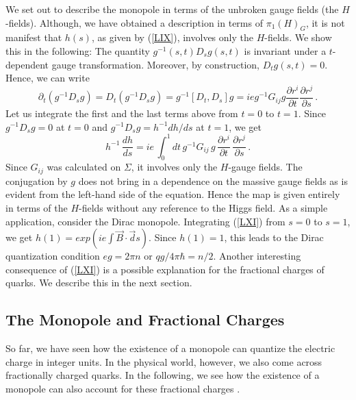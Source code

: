 We set out to describe the monopole in terms of the unbroken gauge
fields (the $H$-fields). Although, we have obtained a description in
terms of $\pi_1(H)_G$, it is not manifest that $h(s)$, as given by
(\ref{LIX}), involves only the $H$-fields. We show this in the
following: The quantity $g^{-1}(s,t)D_s g(s,t)$ is invariant under a
$t$-dependent gauge transformation. Moreover, by construction, $D_t
g(s,t)=0$. Hence, we can write
\begin{equation}
\partial_t(g^{-1}D_s g)= D_t(g^{-1}D_s g)=g^{-1}[D_t,D_s] g =
ie g^{-1} G_{ij} g \frac{\partial r^i}{\partial t} \frac{\partial r^j}
{\partial s}\,.
\label{LX}
\end{equation}
Let us integrate the first and the last terms above from $t=0$ to
$t=1$. Since $g^{-1}D_s g=0$ at $t=0$ and $g^{-1}D_s g=h^{-1}dh/ds$ at
$t=1$, we get
\begin{equation}
h^{-1} \, \frac{dh}{ds} = ie \, \int^{1}_{0} dt \,
g^{-1} G_{ij}\,g \,\frac{\partial r^i}{\partial t} \,
\frac{\partial r^j}{\partial s}\,.
\label{LXI}
\end{equation}
Since $G_{ij}$ was calculated on $\Sigma$, it involves only the
$H$-gauge fields. The conjugation by $g$ does not bring in a
dependence on the massive gauge fields as is evident from the
left-hand side of the equation. Hence the map is given entirely in
terms of the $H$-fields without any reference to the Higgs field. As a
simple application, consider the Dirac monopole. Integrating
(\ref{LXI}) from $s=0$ to $s=1$, we get $h(1)=exp(ie\int {\vec
  B}\cdot{\vec ds})$. Since $h(1)=1$, this leads to the Dirac
quantization condition $eg=2\pi n$ or $qg/4\pi\hbar=n/2$. Another
interesting consequence of (\ref{LXI}) is a possible explanation for
the fractional charges of quarks. We describe this in the next
section. 

\subsection{The Monopole and Fractional Charges}

So far, we have seen how the existence of a monopole can quantize the
electric charge in integer units. In the physical world, however, we
also come across fractionally charged quarks. In the following, we see
how the existence of a monopole can also account for these fractional
charges \cite{CO,GO}.

